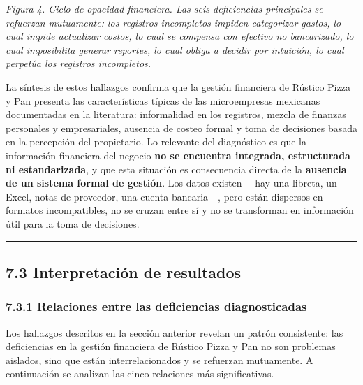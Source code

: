 \documentclass[
  12pt,
  spanish,
]{article}
\begin{document}
\emph{Figura 4. Ciclo de opacidad financiera. Las seis deficiencias
principales se refuerzan mutuamente: los registros incompletos impiden
categorizar gastos, lo cual impide actualizar costos, lo cual se
compensa con efectivo no bancarizado, lo cual imposibilita generar
reportes, lo cual obliga a decidir por intuición, lo cual perpetúa los
registros incompletos.}

La síntesis de estos hallazgos confirma que la gestión financiera de
Rústico Pizza y Pan presenta las características típicas de las
microempresas mexicanas documentadas en la literatura: informalidad en
los registros, mezcla de finanzas personales y empresariales, ausencia
de costeo formal y toma de decisiones basada en la percepción del
propietario. Lo relevante del diagnóstico es que la información
financiera del negocio \textbf{no se encuentra integrada, estructurada
ni estandarizada}, y que esta situación es consecuencia directa de la
\textbf{ausencia de un sistema formal de gestión}. Los datos existen
---hay una libreta, un Excel, notas de proveedor, una cuenta
bancaria---, pero están dispersos en formatos incompatibles, no se
cruzan entre sí y no se transforman en información útil para la toma de
decisiones.

\begin{center}\rule{0.5\linewidth}{0.5pt}\end{center}

\hypertarget{interpretaciuxf3n-de-resultados}{%
\subsection{7.3 Interpretación de
resultados}\label{interpretaciuxf3n-de-resultados}}

\hypertarget{relaciones-entre-las-deficiencias-diagnosticadas}{%
\subsubsection{7.3.1 Relaciones entre las deficiencias
diagnosticadas}\label{relaciones-entre-las-deficiencias-diagnosticadas}}

Los hallazgos descritos en la sección anterior revelan un patrón
consistente: las deficiencias en la gestión financiera de Rústico Pizza
y Pan no son problemas aislados, sino que están interrelacionados y se
refuerzan mutuamente. A continuación se analizan las cinco relaciones
más significativas.
\end{document}
